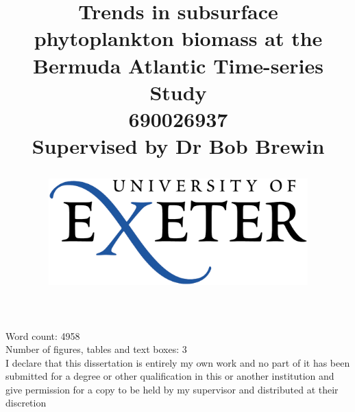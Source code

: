 \documentclass{article}
\begin{document}

\title{
\huge
Trends in subsurface phytoplankton biomass at the Bermuda Atlantic Time-series Study \\
\normalsize
\vspace{0.8cm}
690026937 \\
\vspace{0.5cm}
Supervised by Dr Bob Brewin \\
\begin{center}
\includegraphics[width=10cm, trim=+0cm 0 0 -1cm]{University-of-Exeter-Logo.jpg}
\end{center}
\vspace{}

}
\maketitle
\begin{center}
  Word count: 4958\\
  \vspace{0.5cm}
  Number of figures, tables and text boxes: 3\\
  \vspace{1cm}
  \small
  I declare that this dissertation is entirely my own work and no part of it has been submitted for a degree or other qualification in this or another institution and give permission for a copy to be held by my supervisor and distributed at their discretion
\end{center}
\end{document}
